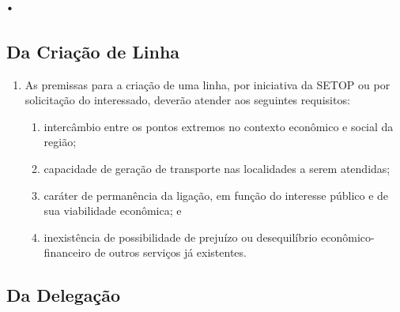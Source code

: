 \chapter{.}

\section{Da Criação de Linha}

\begin{enumerate}[resume, label=Art. \arabic*]

\item As premissas para a criação de uma linha, por iniciativa da SETOP ou por solicitação do interessado, deverão atender aos seguintes requisitos:

\begin{enumerate}[label=\roman*.]

\item intercâmbio entre os pontos extremos no contexto econômico e social da região;

\item capacidade de geração de transporte nas localidades a serem atendidas;

\item caráter de permanência da ligação, em função do interesse público e de sua viabilidade econômica; e

\item inexistência de possibilidade de prejuízo ou desequilíbrio econômico-financeiro de outros serviços já existentes.

\end{enumerate}

\end{enumerate}

\section{Da Delegação}

